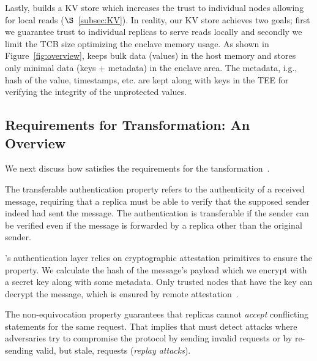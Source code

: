 Lastly, \projecttitle{} builds a KV store which increases the trust to individual nodes allowing for local reads ($\S$~\ref{subsec:KV}). In reality, our KV store achieves two goals; first we guarantee trust to individual replicas to serve reads locally and secondly we limit the TCB size optimizing the enclave memory usage. As shown in Figure~\ref{fig:overview}, \projecttitle{} keeps bulk data (values) in the host memory and stores only minimal data (keys + metadata) in the enclave area. The metadata, i.g., hash of the value, timestamps, etc. are kept along with keys in the TEE for verifying the integrity of the unprotected values.

\subsection{Requirements for Transformation: An Overview}
\label{subsec:req}
We next discuss how \projecttitle{} satisfies the requirements for the tansformation~\cite{clement2012}.


 The transferable authentication property refers to the authenticity of a received message, requiring that a replica must be able to verify that the supposed sender indeed had sent the message. The authentication is transferable if the sender can be verified even if the message is forwarded by a replica other than the original sender. 

 \projecttitle{}'s authentication layer relies on cryptographic attestation primitives to ensure the property. We calculate the hash of the message's payload which we encrypt with a secret key along with some metadata. Only trusted nodes that have the key can decrypt the message, which is ensured by remote attestation~\cite{Parno2010}.%

 The non-equivocation property guarantees that replicas cannot \emph{accept} conflicting statements for the same request. That implies that \projecttitle{} must detect attacks where adversaries try to compromise the protocol by sending invalid requests or by re-sending valid, but stale, requests (\emph{replay attacks}). 

